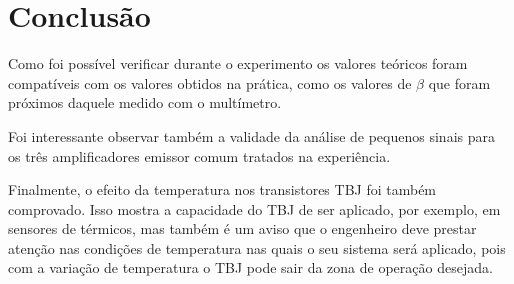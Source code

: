 \documentclass[a4paper]{article} %
\begin{document}











\section*{Conclusão}


Como foi possível verificar durante o experimento os valores teóricos foram compatíveis com os valores obtidos na prática, como os valores de $\beta$ que foram próximos daquele medido com o multímetro.

Foi interessante observar também a validade da análise de pequenos sinais para os três amplificadores emissor comum tratados na experiência. 

Finalmente, o efeito da temperatura nos transistores TBJ foi também comprovado. Isso mostra a capacidade do TBJ de ser aplicado, por exemplo, em sensores de térmicos, mas também é um aviso que o engenheiro deve prestar atenção nas condições de temperatura nas quais o seu sistema será aplicado, pois com a variação de temperatura o TBJ pode sair da zona de operação desejada. 
\end{document}
